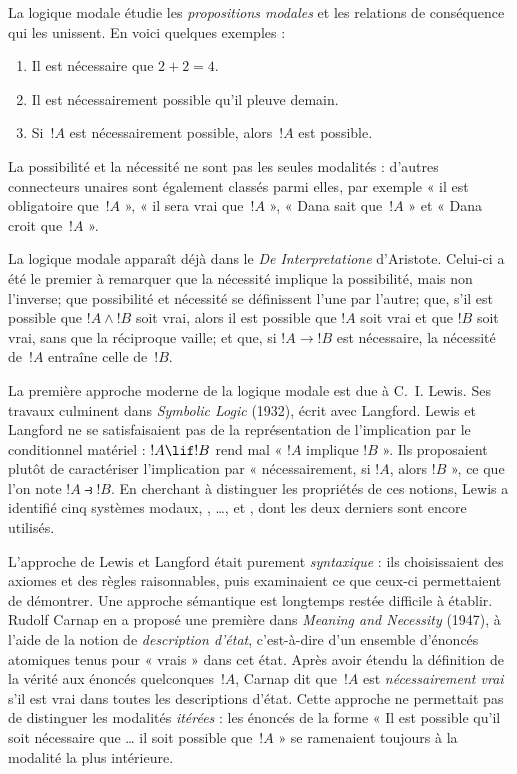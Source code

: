 \documentclass[../../../include/open-logic-section]{subfiles}
\begin{document}


La logique modale étudie les \emph{propositions modales} et les
relations de conséquence qui les unissent. En voici quelques exemples :
\begin{enumerate}
\item Il est nécessaire que $2+2=4$.
\item Il est nécessairement possible qu'il pleuve demain.
\item Si~$!A$ est nécessairement possible, alors~$!A$ est possible.
\end{enumerate}
La possibilité et la nécessité ne sont pas les seules modalités :
d'autres connecteurs unaires sont également classés parmi elles,
par exemple « il est obligatoire que~$!A$ »,
« il sera vrai que~$!A$ »,
« Dana sait que~$!A$ » et « Dana croit que~$!A$ ».

La logique modale apparaît déjà dans le \emph{De Interpretatione}
d'Aristote. Celui-ci a été le premier à remarquer que la nécessité
implique la possibilité, mais non l'inverse; que possibilité et
nécessité se définissent l'une par l'autre; que, s'il est possible que
$!A \land !B$ soit vrai, alors il est possible que $!A$ soit vrai
et que $!B$ soit vrai, sans que la réciproque vaille; et que, si
$!A \to !B$ est nécessaire, la nécessité de~$!A$ entraîne celle
de~$!B$.

La première approche moderne de la logique modale est due à C.~I.
Lewis. Ses travaux culminent dans \emph{Symbolic Logic} (1932),
écrit avec Langford. Lewis et Langford ne se satisfaisaient pas de la
représentation de l'implication par le conditionnel matériel :
$!A \lif !B$ rend mal « $!A$ implique $!B$ ». Ils proposaient
plutôt de caractériser l'implication par « nécessairement, si $!A$,
alors $!B$ », ce que l'on note $!A \strictif !B$. En cherchant à
distinguer les propriétés de ces notions, Lewis a identifié cinq
systèmes modaux, , \ldots,  et , dont les
deux derniers sont encore utilisés.

L'approche de Lewis et Langford était purement \emph{syntaxique} :
ils choisissaient des axiomes et des règles raisonnables, puis
examinaient ce que ceux-ci permettaient de démontrer. Une approche
sémantique est longtemps restée difficile à établir. Rudolf Carnap
en a proposé une première dans \emph{Meaning and Necessity} (1947),
à l'aide de la notion de \emph{description d'état}, c'est-à-dire
d'un ensemble d'énoncés atomiques tenus pour « vrais » dans cet état.
Après avoir étendu la définition de la vérité aux énoncés
quelconques~$!A$, Carnap dit que~$!A$ est \emph{nécessairement vrai}
s'il est vrai dans toutes les descriptions d'état. Cette approche
ne permettait pas de distinguer les modalités \emph{itérées} :
les énoncés de la forme « Il est possible qu'il soit nécessaire que
\ldots{} il soit possible que~$!A$ » se ramenaient toujours à la
modalité la plus intérieure.
\end{document}
